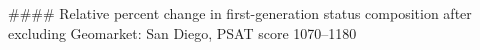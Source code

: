 #### Relative percent change in first-generation status composition after excluding Geomarket: San Diego, PSAT score 1070–1180
